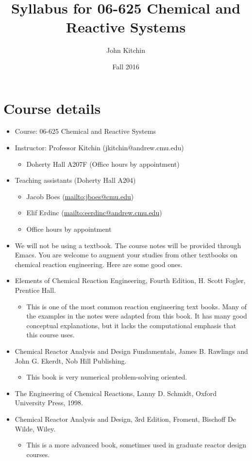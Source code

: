 \documentclass[11pt]{article}
\author{John Kitchin}
\date{Fall 2016}
\title{Syllabus for  06-625 Chemical and Reactive Systems}
\begin{document}
\maketitle
\section{Course details}
\label{sec:orgheadline14}
\begin{itemize}
\item Course: 06-625 Chemical and Reactive Systems

\item Instructor: Professor Kitchin (jkitchin@andrew.cmu.edu)
\begin{itemize}
\item Doherty Hall A207F (Office hours by appointment)
\end{itemize}

\item Teaching assistants (Doherty Hall A204)
\begin{itemize}
\item Jacob Boes (\url{mailto:jboes@cmu.edu})
\item Elif Erdinc (\url{mailto:eerdinc@andrew.cmu.edu})
\item Office hours by appointment
\end{itemize}

\item We will not be using a textbook. The course notes will be provided through Emacs. You are welcome to augment your studies from other textbooks on chemical reaction engineering. Here are some good ones.

\item Elements of Chemical Reaction Engineering, Fourth Edition, H. Scott Fogler, Prentice Hall.
\begin{itemize}
\item This is one of the most common reaction engineering text books. Many of the examples in the notes were adapted from this book. It has many good conceptual explanations, but it lacks the computational emphasis that this course uses.
\end{itemize}

\item Chemical Reactor Analysis and Design Fundamentals, James B. Rawlings and John G. Ekerdt, Nob Hill Publishing.
\begin{itemize}
\item This book is very numerical problem-solving oriented.
\end{itemize}

\item The Engineering of Chemical Reactions, Lanny D. Schmidt, Oxford University Press, 1998.

\item Chemical Reactor Analysis and Design, 3rd Edition, Froment, Bischoff De Wilde, Wiley.
\begin{itemize}
\item This is a more advanced book, sometimes used in graduate reactor design courses.
\end{itemize}
\end{itemize}
\end{document}
